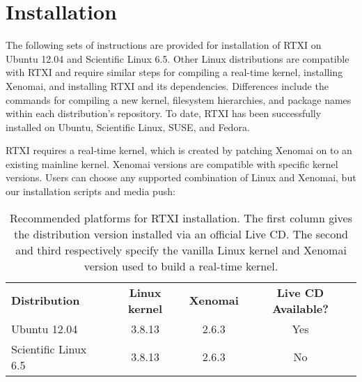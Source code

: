 
\section{Installation}

The following sets of instructions are provided for installation of RTXI on  Ubuntu 12.04 and Scientific Linux 6.5. Other Linux distributions are compatible with RTXI and require similar steps for compiling a real-time kernel, installing Xenomai, and installing RTXI and its dependencies. Differences include the commands for compiling a new kernel, filesystem hierarchies, and package names within each distribution's repository. To date, RTXI has been successfully installed on Ubuntu, Scientific Linux, SUSE, and Fedora. 

RTXI requires a real-time kernel, which is created by patching Xenomai on to an existing mainline kernel. Xenomai versions are compatible with specific kernel versions. Users can choose any supported combination of Linux and Xenomai, but our installation scripts and media push:

\begin{table}[htdp]
\label{configs}
\begin{center}
\vspace{.5cm}
\begin{tabular}{lccc}
\textbf{Distribution} & \textbf{Linux kernel} & \textbf{Xenomai} & \textbf{Live CD Available?}\\
Ubuntu 12.04 & 3.8.13 & 2.6.3 & Yes \\
Scientific Linux 6.5 & 3.8.13 & 2.6.3 & No\\
\end{tabular}
\end{center}
\caption{Recommended platforms for RTXI installation. The first column gives the distribution version installed via an official Live CD. The second and third respectively specify the vanilla Linux kernel and Xenomai version used to build a real-time kernel.}
\end{table}%